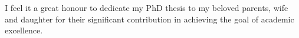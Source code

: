 \begin{dedication}
I feel it a great honour to dedicate my PhD thesis to my beloved parents, wife and daughter 
for their significant contribution in achieving the goal of academic excellence.
\end{dedication}